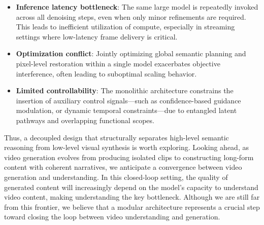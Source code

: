 \begin{itemize}
    \item \textbf{Inference latency bottleneck}: The same large model is repeatedly invoked across all denoising steps, even when only minor refinements are required. This leads to inefficient utilization of compute, especially in streaming settings where low-latency frame delivery is critical.
    \item \textbf{Optimization conflict}: Jointly optimizing global semantic planning and pixel-level restoration within a single model exacerbates objective interference, often leading to suboptimal scaling behavior.
    \item \textbf{Limited controllability}: The monolithic architecture constrains the insertion of auxiliary control signals—such as confidence-based guidance modulation, or dynamic temporal constraints—due to entangled latent pathways and overlapping functional scopes.
\end{itemize}

Thus, a decoupled design that structurally separates high-level semantic reasoning from low-level visual synthesis is worth exploring. Looking ahead, as video generation evolves from producing isolated clips to constructing long-form content with coherent narratives, we anticipate a convergence between video generation and understanding. In this closed-loop setting, the quality of generated content will increasingly depend on the model’s capacity to understand video content, making understanding the key bottleneck. Although we are still far from this frontier, we believe that a modular architecture represents a crucial step toward closing the loop between video understanding and generation.















